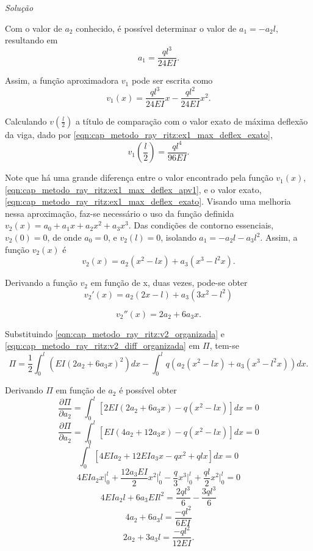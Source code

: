\documentclass[
	12pt,				%
	openright,			%
    twoside,			%
	a4paper,			%
	english,			%
	french,				%
	spanish,			%
	brazil				%
	]{abntex2}
\makeatletter
\renewenvironment{proof}[1][\proofname]{
	\par\pushQED{\qed}%
	\normalfont \topsep6\p@\@plus6\p@\relax
	\trivlist
	\item\relax
		{\itshape
			#1\@addpunct{.}}\hspace\labelsep\ignorespaces
}{%
	\popQED\endtrivlist\@endpefalse
}
\newenvironment{solution}{
	\begin{proof}[Solução]
}{%
	\end{proof}
}
\numberwithin{lema}{chapter}
\numberwithin{teorema}{chapter}
\numberwithin{definicao}{chapter}
\numberwithin{exemplo}{chapter}
\numberwithin{figure}{chapter}
\makeatother
\begin{document}
\begin{solution}
	Com o valor de $a_2$ conhecido, é possível determinar o valor de $a_1=-a_2l$, resultando em
	$$
		a_1=\frac{ql^3}{24EI}
		\text{.}
	$$
	
	Assim, a função aproximadora $v_1$ pode ser escrita como
	$$
		v_1(x)=
		\frac{ql^3}{24EI}x
		-
		\frac{ql^2}{24EI}x^2
		\text{.}
	$$
	
	Calculando $v(\frac{l}{2})$ a título de comparação com o valor exato de máxima deflexão da viga, dado por \eqref{eqn:cap_metodo_ray_ritz:ex1_max_deflex_exato},
	\begin{equation}
		\label{eqn:cap_metodo_ray_ritz:ex1_max_deflex_apv1}
		v_1(\frac{l}{2}) = \frac{ql^4}{96EI}
		\text{.}
	\end{equation}
	
	Note que há uma grande diferença entre o valor encontrado pela função $v_1(x)$, \eqref{eqn:cap_metodo_ray_ritz:ex1_max_deflex_apv1}, e o valor exato, \eqref{eqn:cap_metodo_ray_ritz:ex1_max_deflex_exato}. Visando uma melhoria nessa aproximação, faz-se necessário o uso da função definida $v_2(x)=a_0+a_1x+a_2x^2+a_3x^3$. Das condições de contorno essenciais, $v_2(0)=0$, de onde $a_0=0$, e $v_2(l)=0$, isolando $a_1=-a_2 l - a_3 l^2$. Assim, a função $v_2(x)$ é
	\begin{equation}
		\label{eqn:cap_metodo_ray_ritz:v2_organizada}
		v_2(x)=
		a_2(x^2-lx)
		+
		a_3(x^3-l^2x)
		\text{.}
	\end{equation}
	
	Derivando a função $v_2$ em função de x, duas vezes, pode-se obter
	$$
	v_2'(x) = a_2(2x-l) + a_3(3x^2-l^2)
	$$

	\begin{equation}
		\label{eqn:cap_metodo_ray_ritz:v2_diff_organizada}
		v_2''(x) = 2a_2 + 6a_3 x \text{.}
	\end{equation}
	
	Substituindo \eqref{eqn:cap_metodo_ray_ritz:v2_organizada} e \eqref{eqn:cap_metodo_ray_ritz:v2_diff_organizada} em $\Pi$, tem-se
	$$
		\Pi=
		\frac{1}{2}
		\int_0^l
			\left (
				EI(2a_2+6a_3x)^2
			\right ) dx
		-
		\int_0^l
			q
			\left (
				a_2(x^2-lx)
				+
				a_3(x^3-l^2x)
			\right ) dx
		\text{.}
	$$
	
	Derivando $\Pi$ em função de $a_2$ é possível obter
	$$
		\frac{\partial \Pi}{\partial a_2}
		=
		\int_0^l \left [
			2EI(2a_2+6a_3x)-q(x^2-lx)
		\right ] dx
		= 0
	$$	
	$$
		\frac{\partial \Pi}{\partial a_2}
		=
		\int_0^l \left [
			EI(4a_2+12a_3x)-q(x^2-lx)
		\right ] dx
		= 0
	$$
	$$
		\int_0^l \left [
			4EIa_2 + 12EIa_3x - qx^2 + qlx
		\right ] dx
		= 0
	$$
	$$
		4EIa_2 x \Big |_0^l
		+
		\frac{12a_3EI}{2} x^2 \Big |_0^l
		-
		\frac{q}{3} x^3 \Big |_0^l
		+
		\frac{ql}{2} x^2 \Big |_0^l
		= 0
	$$
	$$
		4EIa_2l
		+
		6a_3EIl^2
		=
		\frac{2ql^3}{6}
		-
		\frac{3ql^3}{6}
	$$
	$$
		4a_2 + 6a_3l
		=
		\frac{-ql^2}{6EI}
	$$
	\begin{equation}
		\label{eq:exemp_rayritz_approx2_eq1}
		2a_2 + 3a_3l
		=
		\frac{-ql^2}{12EI}
		\text{.}
	\end{equation}
	

\end{solution}
\end{document}
